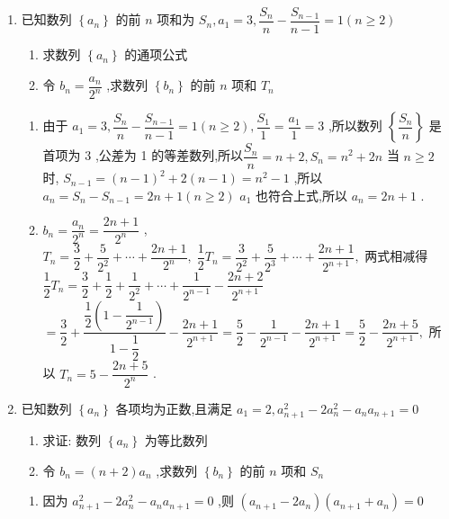 \begin{enumerate}
    \item 已知数列 $ \left\{  {a}_{n}\right\} $ 的前 $ n $ 项和为 $ {S}_{n},{a}_{1} = 3,\dfrac{{S}_{n}}{n} - \dfrac{{S}_{n - 1}}{n - 1} = 1\left( {n \geq  2}\right) $
    \begin{enumerate}
        \item 求数列 $ \left\{  {a}_{n}\right\} $ 的通项公式
        \item 令 $ {b}_{n} = \dfrac{{a}_{n}}{{2}^{n}} $ ,求数列 $ \left\{  {b}_{n}\right\} $ 的前 $ n $ 项和 $ {T}_{n} $
    \end{enumerate}
    \begin{jieda}
        \begin{enumerate}
            \item 由于 $ {a}_{1} = 3,\dfrac{{S}_{n}}{n} - \dfrac{{S}_{n - 1}}{n - 1} = 1\left( {n \geq  2}\right) ,\dfrac{{S}_{1}}{1} = \dfrac{{a}_{1}}{1} = 3 $ ,所以数列 $ \left\{  \dfrac{{S}_{n}}{n}\right\} $ 是首项为 3 ,公差为 1 的等差数列,所以$ \dfrac{{S}_{n}}{n} = n + 2,{S}_{n} = {n}^{2} + {2n} $
            当 $ n \geq  2 $ 时, $ {S}_{n - 1} = {\left( n - 1\right) }^{2} + 2\left( {n - 1}\right)  = {n}^{2} - 1 $ ,所以 $ {a}_{n} = {S}_{n} - {S}_{n - 1} = {2n} + 1\left( {n \geq  2}\right) $
            $ {a}_{1} $ 也符合上式,所以 $ {a}_{n} = {2n} + 1 $ .
            \item $ {b}_{n} = \dfrac{{a}_{n}}{{2}^{n}} = \dfrac{{2n} + 1}{{2}^{n}} $ ,
            $ {T}_{n} = \dfrac{3}{2} + \dfrac{5}{{2}^{2}} + \cdots  + \dfrac{{2n} + 1}{{2}^{n}},\;\dfrac{1}{2}{T}_{n} = \dfrac{3}{{2}^{2}} + \dfrac{5}{{2}^{3}} + \cdots  + \dfrac{{2n} + 1}{{2}^{n + 1}}, $
            两式相减得 $ \dfrac{1}{2}{T}_{n} = \dfrac{3}{2} + \dfrac{1}{2} + \dfrac{1}{{2}^{2}} + \cdots  + \dfrac{1}{{2}^{n - 1}} - \dfrac{{2n} + 2}{{2}^{n + 1}} $
            $ = \dfrac{3}{2} + \dfrac{\dfrac{1}{2}\left( {1 - \dfrac{1}{{2}^{n - 1}}}\right) }{1 - \dfrac{1}{2}} - \dfrac{{2n} + 1}{{2}^{n + 1}} = \dfrac{5}{2} - \dfrac{1}{{2}^{n - 1}} - \dfrac{{2n} + 1}{{2}^{n + 1}} = \dfrac{5}{2} - \dfrac{{2n} + 5}{{2}^{n + 1}}, $
            所以 $ {T}_{n} = 5 - \dfrac{{2n} + 5}{{2}^{n}} $ .
        \end{enumerate}
    \end{jieda}
    \item 已知数列 $ \left\{  {a}_{n}\right\} $ 各项均为正数,且满足 $ {a}_{1} = 2,{a}_{n + 1}^{2} - 2{a}_{n}^{2} - {a}_{n}{a}_{n + 1} = 0 $ 
    \begin{enumerate}
        \item 求证: 数列 $ \left\{  {a}_{n}\right\} $ 为等比数列
        \item 令 $ {b}_{n} = \left( {n + 2}\right) {a}_{n} $ ,求数列 $ \left\{  {b}_{n}\right\} $ 的前 $ n $ 项和 $ {S}_{n} $
    \end{enumerate}
    \begin{jieda}
        \begin{enumerate}
            \item 因为 $ {a}_{n + 1}^{2} - 2{a}_{n}^{2} - {a}_{n}{a}_{n + 1} = 0 $ ,则 $ \left( {{a}_{n + 1} - 2{a}_{n}}\right) \left( {{a}_{n + 1} + {a}_{n}}\right)  = 0 $ 
            

\end{enumerate}
\end{jieda}
\end{enumerate}
